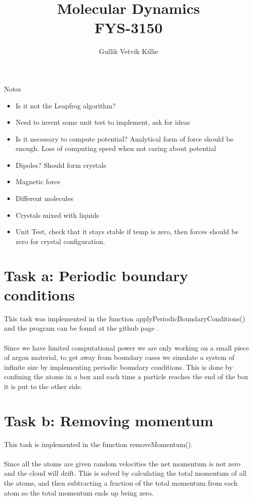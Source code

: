 \documentclass[11pt]{article}
\title{ Molecular Dynamics \\ FYS-3150 }
\author{Gullik Vetvik Killie }
\begin{document}
\maketitle

\tableofcontents

\newpage
Notes
\begin{itemize}
\item Is it not the Leapfrog algorithm?
\item Need to invent some unit test to implement, ask for ideas
\item Is it necessary to compute potential? Analytical form of force should be enough. Loss of computing speed when not caring about potential
\item Dipoles? Should form crystals
\item Magnetic force
\item Different molecules
\item Crystals mixed with liquids
\item Unit Test, check that it stays stable if temp is zero, then forces should be zero for crystal configuration.
\end{itemize}

\section{Task a: Periodic boundary conditions}
	This task was implemented in the function applyPeriodicBoundaryConditions() and the program can be found at the github page \cite{myGit}.
\\ \\
	\noindent Since we have limited computational power we are only working on a small piece of argon material, to get away from boundary cases we simulate a system of infinite size by implementing periodic boundary conditions. This is done by confining the atoms in a box and each time a particle reaches the end of the box it is put to the other side.

\section{Task b: Removing momentum}
	This task is implemented in the function removeMomentum().
\\ \\
	\noindent Since all the atoms are given random velocities the net momentum is not zero and the cloud will drift. This is solved by calculating the total momentum of all the atoms, and then subtracting a fraction of the total momentum from each atom so the total momentum ends up being zero.
\end{document}
